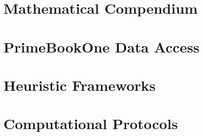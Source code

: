 \documentclass[11pt,a4paper]{book}
\begin{document}
\chapter{Mathematical Compendium}


\appendix
\chapter{PrimeBookOne Data Access}


\chapter{Heuristic Frameworks}


\chapter{Computational Protocols}




\end{document}

